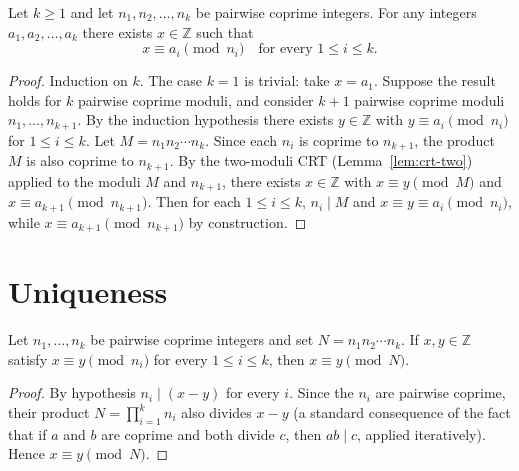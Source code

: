 \begin{theorem}
    \label{thm:crt-existence}
    Let $k \geq 1$ and let $n_1, n_2, \ldots, n_k$ be pairwise coprime
    integers. For any integers $a_1, a_2, \ldots, a_k$ there exists
    $x \in \mathbb{Z}$ such that
    \[
        x \equiv a_i \pmod{n_i} \quad \text{for every } 1 \leq i \leq k.
    \]
\end{theorem}
\begin{proof}
    Induction on $k$. The case $k = 1$ is trivial: take $x = a_1$. Suppose
    the result holds for $k$ pairwise coprime moduli, and consider $k+1$
    pairwise coprime moduli $n_1, \ldots, n_{k+1}$. By the induction
    hypothesis there exists $y \in \mathbb{Z}$ with $y \equiv a_i \pmod{n_i}$
    for $1 \leq i \leq k$. Let $M = n_1 n_2 \cdots n_k$. Since each $n_i$ is
    coprime to $n_{k+1}$, the product $M$ is also coprime to $n_{k+1}$. By
    the two-moduli CRT (Lemma~\ref{lem:crt-two}) applied to the moduli $M$
    and $n_{k+1}$, there exists $x \in \mathbb{Z}$ with $x \equiv y \pmod M$
    and $x \equiv a_{k+1} \pmod{n_{k+1}}$. Then for each $1 \leq i \leq k$,
    $n_i \mid M$ and $x \equiv y \equiv a_i \pmod{n_i}$, while
    $x \equiv a_{k+1} \pmod{n_{k+1}}$ by construction.
\end{proof}

\section{Uniqueness}

\begin{theorem}
    \label{thm:crt-uniqueness}
    Let $n_1, \ldots, n_k$ be pairwise coprime integers and set
    $N = n_1 n_2 \cdots n_k$. If $x, y \in \mathbb{Z}$ satisfy
    $x \equiv y \pmod{n_i}$ for every $1 \leq i \leq k$, then
    $x \equiv y \pmod{N}$.
\end{theorem}
\begin{proof}
    By hypothesis $n_i \mid (x - y)$ for every $i$. Since the $n_i$ are
    pairwise coprime, their product $N = \prod_{i=1}^{k} n_i$ also divides
    $x - y$ (a standard consequence of the fact that if $a$ and $b$ are
    coprime and both divide $c$, then $ab \mid c$, applied iteratively).
    Hence $x \equiv y \pmod{N}$.
\end{proof}

